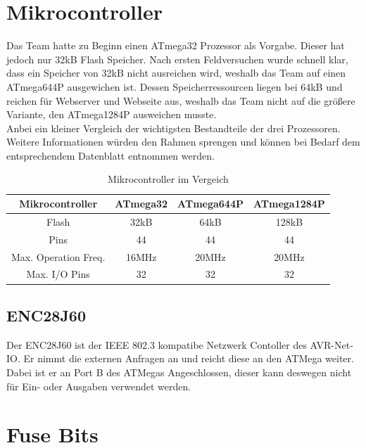 \section{Mikrocontroller}
Das Team hatte zu Beginn einen ATmega32 Prozessor als Vorgabe. Dieser hat jedoch nur 32kB Flash Speicher. Nach ersten 
Feldversuchen wurde schnell klar, dass ein Speicher von 32kB nicht ausreichen wird, weshalb das Team auf einen ATmega644P 
ausgewichen ist. Dessen Speicherressourcen liegen bei 64kB und reichen für Webserver und Webseite aus, weshalb das Team 
nicht auf die größere Variante, den ATmega1284P ausweichen musste.\\ 
Anbei ein kleiner Vergleich der wichtigsten Bestandteile der 
drei Prozessoren. Weitere Informationen würden den Rahmen sprengen und können
bei Bedarf dem entsprechendem Datenblatt entnommen werden.

\begin{table}[H]
\begin{tabular}{|c|c|c|c|} \hline 
  Mikrocontroller & ATmega32 & ATmega644P & ATmega1284P \\ \hline 
  Flash & 32kB & 64kB & 128kB \\ \hline
  Pins & 44 & 44 & 44 \\ \hline
  Max. Operation Freq. & 16MHz & 20MHz & 20MHz\\ \hline
  Max. I/O Pins & 32 & 32 & 32 \\ \hline
\end{tabular}
\caption{Mikrocontroller im Vergeich}
\label{mikrocontroller}
\end{table}

\subsection{ENC28J60}

Der ENC28J60 ist der IEEE 802.3 kompatibe Netzwerk Contoller des AVR-Net-IO. Er
nimmt die externen Anfragen an und reicht diese an den ATMega weiter. Dabei ist
er an Port B des ATMegas Angeschlossen, dieser kann deswegen nicht für Ein- oder
Ausgaben verwendet werden.

\newpage
\section{Fuse Bits}
\label{chap:Fuse}

